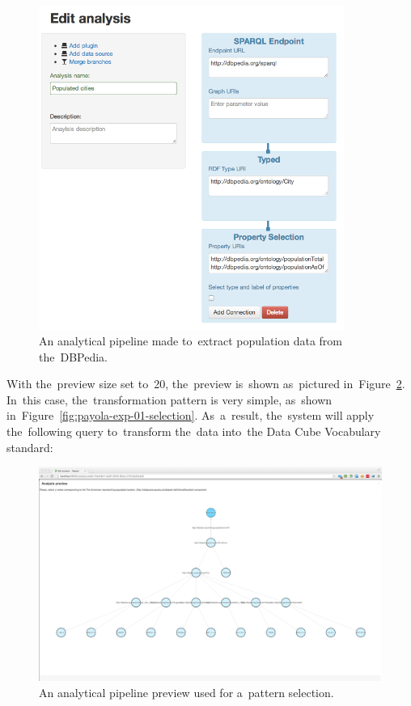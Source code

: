 \begin{figure}
  \centering
  \includegraphics[width=100mm]{img/payola-exp-01-step1.png}
  \caption{An analytical pipeline made to~extract population data from the~DBPedia.}
  \label{fig:dbpedia-pop-anal}
\end{figure}

With the~preview size set to~20, the~preview is~shown as~pictured in~Figure~\ref{fig:payola-exp-01-preview}. In~this case, the~transformation pattern 
is very simple, as~shown in~Figure~\ref{fig:payola-exp-01-selection}. As~a~result, the~system will apply the~following query to~transform the~data into~the
Data Cube Vocabulary standard:

\begin{figure}
  \centering
  \includegraphics[width=140mm]{img/payola-exp-01-preview.png}
  \caption{An analytical pipeline preview used for a~pattern selection.}
  \label{fig:payola-exp-01-preview}
\end{figure}

